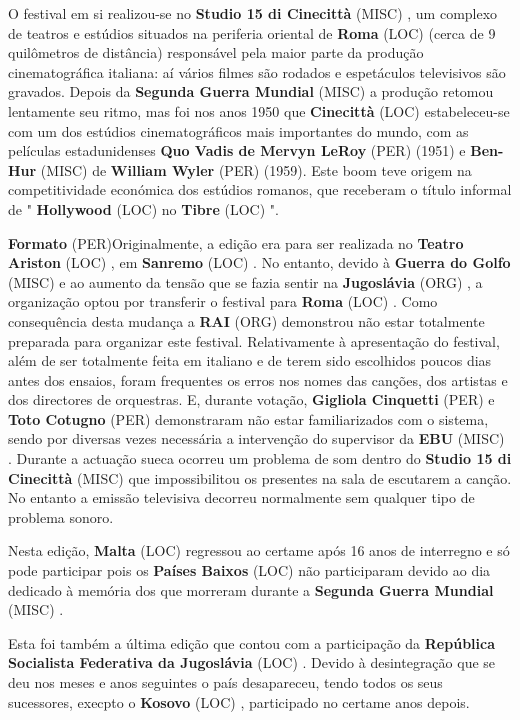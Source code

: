 \documentclass[12pt,a4paper]{article}
\begin{document}
O festival em si realizou-se no \textbf{Studio 15 di Cinecittà} (MISC) , um complexo de teatros e estúdios situados na periferia oriental de \textbf{Roma} (LOC) (cerca de 9 quilômetros de distância) responsável pela maior parte da produção cinematográfica italiana: aí vários filmes são rodados e espetáculos televisivos são gravados. Depois da \textbf{Segunda Guerra Mundial} (MISC) a produção retomou lentamente seu ritmo, mas foi nos anos 1950 que \textbf{Cinecittà} (LOC) estabeleceu-se com um dos estúdios cinematográficos mais importantes do mundo, com as películas estadunidenses \textbf{Quo Vadis de Mervyn LeRoy} (PER) (1951) e \textbf{Ben-Hur} (MISC) de \textbf{William Wyler} (PER) (1959). Este boom teve origem na competitividade económica dos estúdios romanos, que receberam o título informal de " \textbf{Hollywood} (LOC) no \textbf{Tibre} (LOC) ".



\textbf{Formato} (PER)Originalmente, a edição era para ser realizada no \textbf{Teatro Ariston} (LOC) , em \textbf{Sanremo} (LOC) . No entanto, devido à \textbf{Guerra do Golfo} (MISC) e ao aumento da tensão que se fazia sentir na \textbf{Jugoslávia} (ORG) , a organização optou por transferir o festival para \textbf{Roma} (LOC) . Como consequência desta mudança a \textbf{RAI} (ORG) demonstrou não estar totalmente preparada para organizar este festival. Relativamente à apresentação do festival, além de ser totalmente feita em italiano e de terem sido escolhidos poucos dias antes dos ensaios, foram frequentes os erros nos nomes das canções, dos artistas e dos directores de orquestras. E, durante votação, \textbf{Gigliola Cinquetti} (PER) e \textbf{Toto Cotugno} (PER) demonstraram não estar familiarizados com o sistema, sendo por diversas vezes necessária a intervenção do supervisor da \textbf{EBU} (MISC) . Durante a actuação sueca ocorreu um problema de som dentro do \textbf{Studio 15 di Cinecittà} (MISC) que impossibilitou os presentes na sala de escutarem a canção. No entanto a emissão televisiva decorreu normalmente sem qualquer tipo de problema sonoro.

Nesta edição, \textbf{Malta} (LOC) regressou ao certame após 16 anos de interregno e só pode participar pois os \textbf{Países Baixos} (LOC) não participaram devido ao dia dedicado à memória dos que morreram durante a \textbf{Segunda Guerra Mundial} (MISC) .

Esta foi também a última edição que contou com a participação da \textbf{República Socialista Federativa da Jugoslávia} (LOC) . Devido à desintegração que se deu nos meses e anos seguintes o país desapareceu, tendo todos os seus sucessores, execpto o \textbf{Kosovo} (LOC) , participado no certame anos depois.
\end{document}
